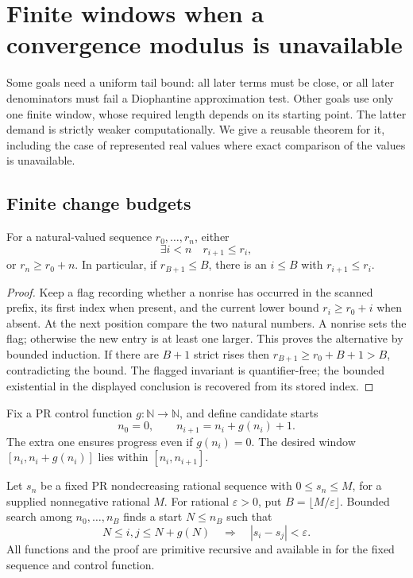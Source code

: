 \section{Finite windows when a convergence modulus is unavailable}
\label{sec:metastability}

Some goals need a uniform tail bound: all later terms must be close, or
all later denominators must fail a Diophantine approximation test.  Other
goals use only one finite window, whose required length depends on its
starting point.  The latter demand is strictly weaker computationally.
We give a reusable theorem for it, including the case of represented
real values where exact comparison of the values is unavailable.

\subsection{Finite change budgets}

\begin{lemma}\label{lem:rise}
For a natural-valued sequence \(r_0,\ldots,r_n\), either
\[
 \exists i<n\quad r_{i+1}\le r_i,
\]
or \(r_n\ge r_0+n\).  In particular, if \(r_{B+1}\le B\), there is
an \(i\le B\) with \(r_{i+1}\le r_i\).
\end{lemma}

\begin{proof}
Keep a flag recording whether a nonrise has occurred in the scanned
prefix, its first index when present, and the current lower bound
\(r_i\ge r_0+i\) when absent.  At the next position compare the two
natural numbers.  A nonrise sets the flag; otherwise the new entry is at
least one larger.  This proves the alternative by bounded induction.
If there are \(B+1\) strict rises then
\(r_{B+1}\ge r_0+B+1>B\), contradicting the bound.
The flagged invariant is quantifier-free; the bounded existential in
the displayed conclusion is recovered from its stored index.
\end{proof}

Fix a PR control function \(g:\mathbb N\to\mathbb N\), and define
candidate starts
\begin{equation}\label{eq:window-starts}
 n_0=0,\qquad n_{i+1}=n_i+g(n_i)+1.
\end{equation}
The extra one ensures progress even if \(g(n_i)=0\).  The desired
window \([n_i,n_i+g(n_i)]\) lies within
\([n_i,n_{i+1}]\).

\begin{theorem}\label{thm:rational-window}
Let \(s_n\) be a fixed PR nondecreasing rational sequence with
\(0\le s_n\le M\), for a supplied nonnegative rational \(M\).
For rational \(\varepsilon>0\), put
\(B=\lfloor M/\varepsilon\rfloor\).  Bounded search among
\(n_0,\ldots,n_B\) finds a start \(N\le n_B\) such that
\[
 N\le i,j\le N+g(N)
 \quad\Longrightarrow\quad |s_i-s_j|<\varepsilon.
\]
All functions and the proof are primitive recursive and available in
\ipra for the fixed sequence and control function.
\end{theorem}

